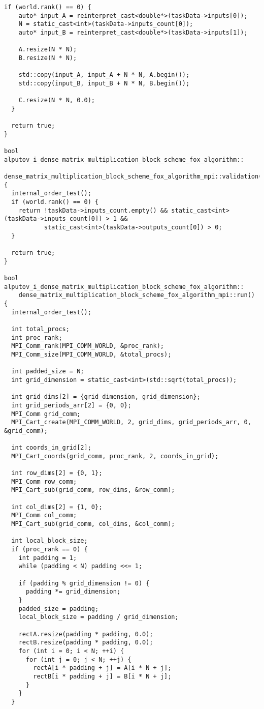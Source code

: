 \documentclass{report}
\begin{document}
\begin{lstlisting}[caption={opsmpi.cpp},label=lst:opsmpi2]
  if (world.rank() == 0) {
    auto* input_A = reinterpret_cast<double*>(taskData->inputs[0]);
    N = static_cast<int>(taskData->inputs_count[0]);
    auto* input_B = reinterpret_cast<double*>(taskData->inputs[1]);

    A.resize(N * N);
    B.resize(N * N);

    std::copy(input_A, input_A + N * N, A.begin());
    std::copy(input_B, input_B + N * N, B.begin());

    C.resize(N * N, 0.0);
  }

  return true;
}

bool alputov_i_dense_matrix_multiplication_block_scheme_fox_algorithm::
    dense_matrix_multiplication_block_scheme_fox_algorithm_mpi::validation() {
  internal_order_test();
  if (world.rank() == 0) {
    return !taskData->inputs_count.empty() && static_cast<int>(taskData->inputs_count[0]) > 1 &&
           static_cast<int>(taskData->outputs_count[0]) > 0;
  }

  return true;
}

bool alputov_i_dense_matrix_multiplication_block_scheme_fox_algorithm::
    dense_matrix_multiplication_block_scheme_fox_algorithm_mpi::run() {
  internal_order_test();

  int total_procs;
  int proc_rank;
  MPI_Comm_rank(MPI_COMM_WORLD, &proc_rank);
  MPI_Comm_size(MPI_COMM_WORLD, &total_procs);

  int padded_size = N;
  int grid_dimension = static_cast<int>(std::sqrt(total_procs));

  int grid_dims[2] = {grid_dimension, grid_dimension};
  int grid_periods_arr[2] = {0, 0};
  MPI_Comm grid_comm;
  MPI_Cart_create(MPI_COMM_WORLD, 2, grid_dims, grid_periods_arr, 0, &grid_comm);

  int coords_in_grid[2];
  MPI_Cart_coords(grid_comm, proc_rank, 2, coords_in_grid);

  int row_dims[2] = {0, 1};
  MPI_Comm row_comm;
  MPI_Cart_sub(grid_comm, row_dims, &row_comm);

  int col_dims[2] = {1, 0};
  MPI_Comm col_comm;
  MPI_Cart_sub(grid_comm, col_dims, &col_comm);

  int local_block_size;
  if (proc_rank == 0) {
    int padding = 1;
    while (padding < N) padding <<= 1;

    if (padding % grid_dimension != 0) {
      padding *= grid_dimension;
    }
    padded_size = padding;
    local_block_size = padding / grid_dimension;

    rectA.resize(padding * padding, 0.0);
    rectB.resize(padding * padding, 0.0);
    for (int i = 0; i < N; ++i) {
      for (int j = 0; j < N; ++j) {
        rectA[i * padding + j] = A[i * N + j];
        rectB[i * padding + j] = B[i * N + j];
      }
    }
  }


\end{lstlisting}
\end{document}
